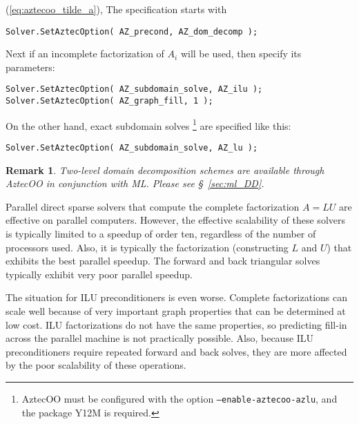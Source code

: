 \documentclass[10pt,relax]{SANDreport}
\newtheorem{remark}{Remark}
\begin{document}
(\ref{eq:aztecoo_tilde_a}),
The specification starts with
\begin{verbatim}
Solver.SetAztecOption( AZ_precond, AZ_dom_decomp );
\end{verbatim}
Next if an incomplete factorization of $A_i$ will be used, then specify its parameters:
\begin{verbatim}
Solver.SetAztecOption( AZ_subdomain_solve, AZ_ilu );
Solver.SetAztecOption( AZ_graph_fill, 1 );
\end{verbatim}
On the other hand, exact subdomain solves
\footnote{AztecOO must be
  configured with the option {\tt --enable-aztecoo-azlu}, and the
  package Y12M is required.}
are specified like this:
\begin{verbatim}
Solver.SetAztecOption( AZ_subdomain_solve, AZ_lu );
\end{verbatim}

\begin{remark}
  Two-level domain decomposition schemes \cite{smbg:96}
are available through AztecOO in conjunction with ML.
Please see \S~\ref{sec:ml_DD}.
\end{remark}


Parallel direct sparse solvers that compute the complete factorization $A=LU$
are effective on parallel computers.  However, the effective scalability
of these solvers is typically limited to a speedup of order ten, regardless
of the number of processors used.  Also, it is typically the factorization
(constructing $L$ and $U$) that exhibits the best parallel speedup.  The
forward and back triangular solves typically exhibit very poor parallel speedup.

The situation for ILU preconditioners is even worse.  Complete factorizations
can scale well because of very important graph properties that can be determined
at low cost.  ILU factorizations do not have the same properties, so predicting
fill-in across the parallel machine is not practically possible.  Also, because ILU
preconditioners require repeated forward and back solves, they are more affected
by the poor scalability of these operations.
\end{document}
